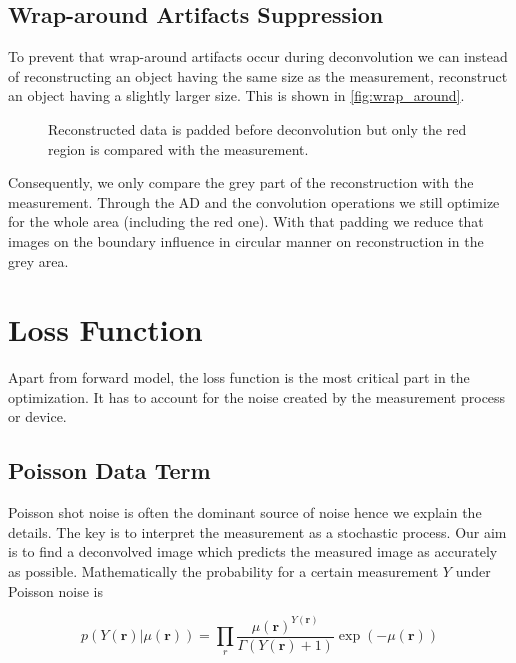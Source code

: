 \documentclass{juliacon}
\begin{document}
\subsection{Wrap-around Artifacts Suppression}
    \label{sec:wrap}
    To prevent that wrap-around artifacts occur during deconvolution we can instead
    of reconstructing an object having the same size as the measurement, reconstruct
    an object having a slightly larger size. This is shown in \autoref{fig:wrap_around}.
    \begin{figure}[h]
        \centering
        \caption{Reconstructed data is padded before deconvolution but only the red region is compared with the measurement.}
        \label{fig:wrap_around}
    \end{figure}
    Consequently, we only compare the grey part of the reconstruction with the measurement.
    Through the AD and the convolution operations we still optimize for the whole area (including the red one).
    With that padding we reduce that images on the boundary influence in circular manner on reconstruction in the grey area.


\section{Loss Function}
    Apart from forward model, the loss function is the most critical part in the optimization.
    It has to account for the noise created by the measurement process or device. 

\subsection{Poisson Data Term}
    Poisson shot noise is often the dominant source of noise hence we 
    explain the details.
    The key is to interpret the measurement as a stochastic process. 
    Our aim is to find a deconvolved image which predicts the measured image as accurately as 
    possible.
    Mathematically the probability for a certain measurement $Y$ under Poisson noise is


\begin{equation}
    p(Y(\mathbf r)|\mu(\mathbf r)) = \prod_r \frac{\mu(\mathbf r)^{Y(\mathbf r)}}{\Gamma(Y(\mathbf r) + 1)} \exp(- \mu(\mathbf r))
\end{equation}
\end{document}
